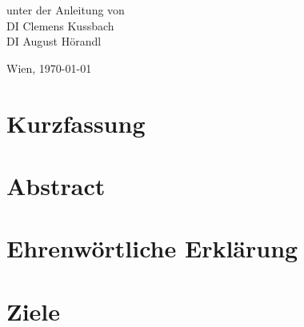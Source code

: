\documentclass[
    headings=optiontotocandhead,%
    twoside,
    numbers=noenddot,%
    toc=flat, %
    12pt, %
    titlepage, %
    parskip=full, %
    listof=totoc, %
    listof=flat, %
    numbers=noenddot, %
    bibliography=totoc, %
    a4paper,DIV=14,
    BCOR=15mm,
]{scrbook}
\begin{document}
\begin{titlepage}
\begin{center}
\par\end{center}{\large \par}

\begin{center}
\vspace{20mm}
 \normalsize unter der Anleitung von\\
 \vspace{0.5cm}
DI Clemens Kussbach\\
DI August Hörandl
\par\end{center}

\begin{center}
\vspace{5mm}
Wien, \today 
\par\end{center}

\end{titlepage}%
\renewcommand{\kapitelautor}{}  %
\chapter*{Kurzfassung}

\cleardoublepage{}

\chapter*{Abstract}


\chapter*{Ehrenwörtliche Erklärung}


\cleardoublepage{}
\tableofcontents{}
\cleardoublepage{}
\listoftables
{}
\cleardoublepage{}
\listoffigures


\cleardoublepage{}
\mainmatter

\chapter{Ziele}
\end{document}
